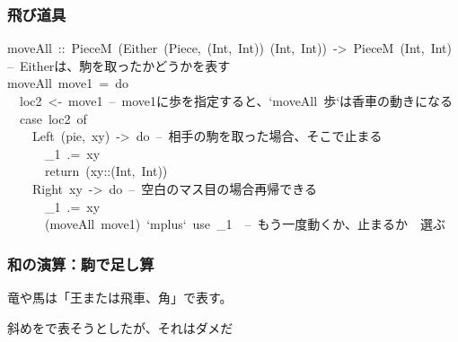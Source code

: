 \documentclass[xcolor=table]{beamer}
\begin{document}
\begin{mdframe}%

\frametitle{飛び道具}\label{heading-section}%
\begin{mdpre}%
\noindent moveAll~{::}~{PieceM}~{(}{Either}~{(}{Piece}{,}~{(}{Int}{,}~{Int}{)}{)}~{(}{Int}{,}~{Int}{)}{)}~{-\textgreater{}}~{PieceM}~{(}{Int}{,}~{Int}{)}\\
{--~Eitherは、駒を取ったかどうかを表す}\\
moveAll~move1~{=}~{do}\\
~~loc2~\textless{}-~move1~{--~move1に歩を指定すると、`moveAll~歩`は香車の動きになる}\\
~~{case}~loc2~{of}\\
~~~~{Left}~(pie,~xy)~{-\textgreater{}}~{do}~{--~相手の駒を取った場合、そこで止まる}\\
~~~~~~\_1~.=~xy\\
~~~~~~return~(xy{::}{(}{Int}{,}~{Int}{)})\\
~~~~{Right}~xy~{-\textgreater{}}~{do}~{--~空白のマス目の場合再帰できる}\\
~~~~~~\_1~.=~xy\\
~~~~~~(moveAll~move1)~`mplus`~use~\_1~~{--~もう一度動くか、止まるか~~選ぶ}%
\end{mdpre}%
\end{mdframe}\label{section}%

\begin{mdframe}%

\frametitle{和の演算：駒で足し算}\label{heading-section}%

\noindent{}竜や馬は「王または飛車、角」で表す。%

斜めをで表そうとしたが、それはダメだ%
\end{mdframe}\label{section}%
\end{document}
